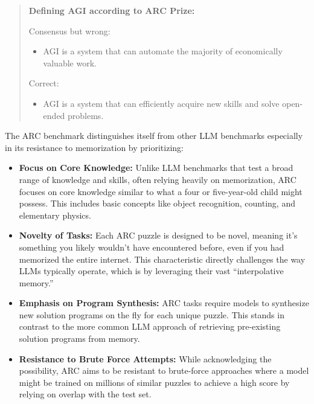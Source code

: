 \begin{quote}
\textbf{Defining AGI according to ARC Prize:}

Consensus but wrong:
\begin{itemize}
    \item AGI is a system that can automate the majority of economically valuable work.
\end{itemize}

Correct:
\begin{itemize}
    \item AGI is a system that can efficiently acquire new skills and solve open-ended problems.
\end{itemize}
\end{quote}

The ARC benchmark distinguishes itself from other LLM benchmarks especially in its resistance to memorization by prioritizing:

\begin{itemize}
    \item \textbf{Focus on Core Knowledge:} Unlike LLM benchmarks that test a broad range of knowledge and skills, often relying heavily on memorization, ARC focuses on core knowledge similar to what a four or five-year-old child might possess. This includes basic concepts like object recognition, counting, and elementary physics.

    \item \textbf{Novelty of Tasks:} Each ARC puzzle is designed to be novel, meaning it's something you likely wouldn't have encountered before, even if you had memorized the entire internet. This characteristic directly challenges the way LLMs typically operate, which is by leveraging their vast ``interpolative memory.''

    \item \textbf{Emphasis on Program Synthesis:} ARC tasks require models to synthesize new solution programs on the fly for each unique puzzle. This stands in contrast to the more common LLM approach of retrieving pre-existing solution programs from memory.

    \item \textbf{Resistance to Brute Force Attempts:} While acknowledging the possibility, ARC aims to be resistant to brute-force approaches where a model might be trained on millions of similar puzzles to achieve a high score by relying on overlap with the test set.
\end{itemize}


